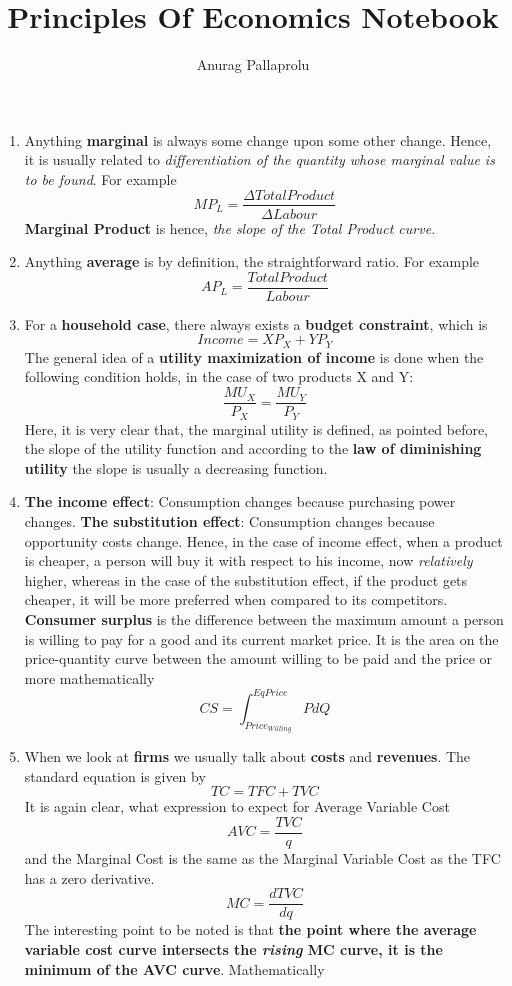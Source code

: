 \documentclass[12pt]{article}
\begin{document}
\title{Principles Of Economics Notebook}
\author{Anurag Pallaprolu}
\maketitle
\begin{enumerate}
\item Anything \textbf{marginal} is always some change upon some other change. Hence, it is usually related to \textit{differentiation of the quantity whose marginal value is to be found}. For example
$$MP_L = \frac{\Delta Total Product}{\Delta Labour}$$
\textbf{Marginal Product} is hence, \textit{the slope of the Total Product curve.}
\item Anything \textbf{average} is by definition, the straightforward ratio. For example
$$AP_L = \frac{Total Product}{Labour}$$
\item For a \textbf{household case}, there always exists a \textbf{budget constraint}, which is
$$Income = XP_X + YP_Y$$
The general idea of a \textbf{utility maximization of income} is done when the following condition holds, in the case of two products X and Y:
$$\frac{MU_X}{P_X} = \frac{MU_Y}{P_Y}$$
Here, it is very clear that, the marginal utility is defined, as pointed before, the slope of the utility function and according to the \textbf{law of diminishing utility} the slope is usually a decreasing function.
\item \textbf{The income effect}:  Consumption changes because purchasing power changes.
\textbf{The substitution effect}:  Consumption changes because opportunity costs change. Hence, in the case of income effect, when a product is cheaper, a person will buy it with respect to his income, now \textit{relatively} higher, whereas in the case of the substitution effect, if the product gets cheaper, it will be more preferred when compared to its competitors. \textbf{Consumer surplus} is the difference between the maximum amount a person is willing to pay for a good and its current market price. It is the area on the price-quantity curve between the amount willing to be paid and the price or more mathematically
$$CS = \int_{Price_{Willing}}^{Eq Price} PdQ$$
\item When we look at \textbf{firms} we usually talk about \textbf{costs} and \textbf{revenues}. The standard equation is given by 
$$TC = TFC + TVC$$
It is again clear, what expression to expect for Average Variable Cost $$AVC = \frac{TVC}{q}$$
and the Marginal Cost is the same as the Marginal Variable Cost as the TFC has a zero derivative.
$$MC = \frac{dTVC}{dq}$$ The interesting point to be noted is that \textbf{the point where the average variable cost curve intersects the \textit{rising} MC curve, it is the minimum of the AVC curve}. Mathematically

\end{enumerate}
\end{document}
